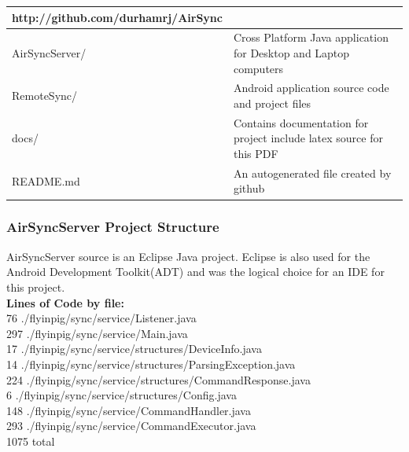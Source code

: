 \documentclass[12pt]{article}
\begin{document}
\begin{center}
\begin{tabular}{|l|p{7.5cm}|}
\hline
	\textbf{http://github.com/durhamrj/AirSync} \\
\hline
	AirSyncServer/ 
	& Cross Platform Java application for Desktop and Laptop computers\\
\hline 
	RemoteSync/
	& Android application source code and project files\\
\hline
	docs/
	& Contains documentation for project include latex source for this PDF\\
\hline
	README.md
	& An autogenerated file created by github\\
\hline
\end{tabular}
\end{center}

\subsubsection{AirSyncServer Project Structure}
AirSyncServer source is an Eclipse Java project. Eclipse is also used for the Android Development Toolkit(ADT) and was the logical choice for an IDE for this project. \\

\textbf{Lines of Code by file:}\\
  76 ./flyinpig/sync/service/Listener.java\\
  297 ./flyinpig/sync/service/Main.java\\
   17 ./flyinpig/sync/service/structures/DeviceInfo.java\\
   14 ./flyinpig/sync/service/structures/ParsingException.java\\
  224 ./flyinpig/sync/service/structures/CommandResponse.java\\
    6 ./flyinpig/sync/service/structures/Config.java\\
  148 ./flyinpig/sync/service/CommandHandler.java\\
  293 ./flyinpig/sync/service/CommandExecutor.java\\
 1075 total\\
\end{document}
